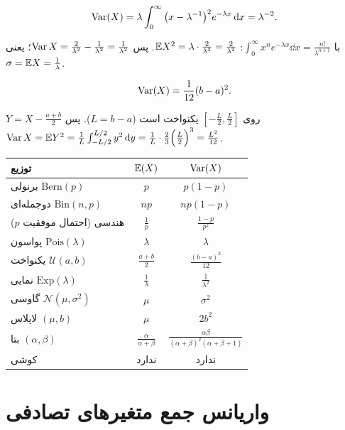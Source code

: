 \begin{example}
\[
\operatorname{Var}(X)=\lambda\int_0^\infty\big(x-\lambda^{-1}\big)^2e^{-\lambda x}\,\mathrm{d} x=\lambda^{-2}.
\]
\begin{solution}
با $\int_0^\infty x^ne^{-\lambda x}\dd x=\frac{n!}{\lambda^{n+1}}$: $\mathbb{E} X^2=\lambda\cdot\frac{2}{\lambda^3}=\frac{2}{\lambda^2}$. پس $\operatorname{Var} X=\frac2{\lambda^2}-\frac1{\lambda^2}=\frac{1}{\lambda^2}$؛ یعنی $\sigma=\mathbb{E} X=\frac1\lambda$.
\end{solution}
\end{example}

\begin{example}
\[
\operatorname{Var}(X)=\frac{1}{12}(b-a)^2 .
\]
\begin{solution}
$Y=X-\frac{a+b}{2}$ روی $[-\frac L2,\frac L2]$ یکنواخت است ($L=b-a$). پس
$\operatorname{Var} X=\mathbb{E} Y^2=\frac1L\int_{-L/2}^{L/2}y^2\,\mathrm{d} y=\frac1L\cdot\frac{2}{3}\Big(\frac L2\Big)^3=\frac{L^2}{12}$.
\end{solution}
\end{example}

\begin{summarybox}
\centering
\renewcommand{\arraystretch}{1.5}
\begin{tabular}{l|c|c}
توزیع & $\mathbb{E}(X)$ & $\operatorname{Var}(X)$\\\hline
برنولی $\mathrm{Bern}(p)$ & $p$ & $p(1-p)$\\
دوجمله‌ای $\mathrm{Bin}(n,p)$ & $np$ & $np(1-p)$\\
هندسی (احتمال موفقیت $p$) & $\frac1p$ & $\frac{1-p}{p^2}$\\
پواسون $\mathrm{Pois}(\lambda)$ & $\lambda$ & $\lambda$\\
یکنواخت $\mathcal U(a,b)$ & $\frac{a+b}2$ & $\frac{(b-a)^2}{12}$\\
نمایی $\mathrm{Exp}(\lambda)$ & $\frac1\lambda$ & $\frac1{\lambda^2}$\\
گاوسی $\mathcal N(\mu,\sigma^2)$ & $\mu$ & $\sigma^2$\\
لاپلاس $(\mu,b)$ & $\mu$ & $2b^2$\\
بتا $(\alpha,\beta)$ & $\frac{\alpha}{\alpha+\beta}$ & $\frac{\alpha\beta}{(\alpha+\beta)^2(\alpha+\beta+1)}$\\
کوشی & ندارد & ندارد
\end{tabular}
\end{summarybox}

\section{واریانس جمع متغیرهای تصادفی }


